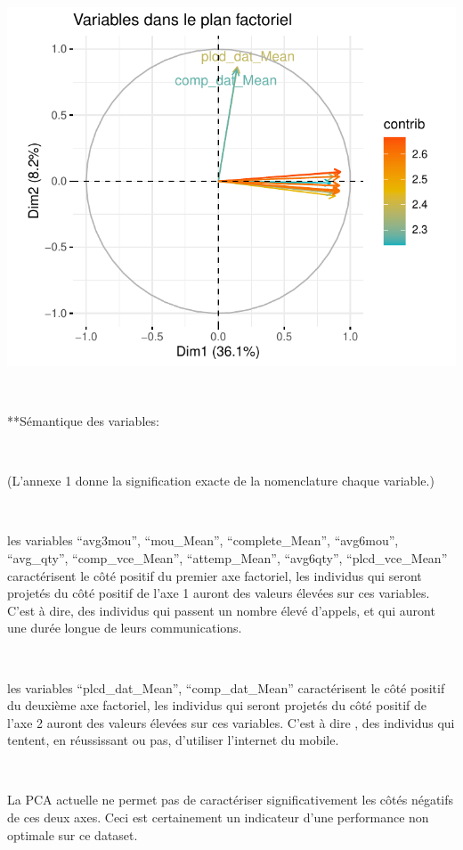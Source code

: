 \documentclass[]{imsart}
\numberwithin{equation}{section}
\theoremstyle{plain}
\begin{document}
~

\begin{flushleft}\includegraphics{Analyse_Exploratoire_Projet_files/figure-latex/unnamed-chunk-16-1} \end{flushleft}

~

**Sémantique des variables:

~

(L'annexe 1 donne la signification exacte de la nomenclature chaque variable.)

~

les variables ``avg3mou'', ``mou\_Mean'', ``complete\_Mean'', ``avg6mou'', ``avg\_qty'', ``comp\_vce\_Mean'', ``attemp\_Mean'', ``avg6qty'', ``plcd\_vce\_Mean'' caractérisent le côté positif du premier axe factoriel, les individus qui seront projetés du côté positif de l'axe 1 auront des valeurs élevées sur ces variables. C'est à dire, des individus qui passent un nombre élevé d'appels, et qui auront une durée longue de leurs communications.

~

les variables ``plcd\_dat\_Mean'', ``comp\_dat\_Mean'' caractérisent le côté positif du deuxième axe factoriel, les individus qui seront projetés du côté positif de l'axe 2 auront des valeurs élevées sur ces variables. C'est à dire , des individus qui tentent, en réussissant ou pas, d'utiliser l'internet du mobile.

~

La PCA actuelle ne permet pas de caractériser significativement les côtés négatifs de ces deux axes. Ceci est certainement un indicateur d'une performance non optimale sur ce dataset.
\end{document}

